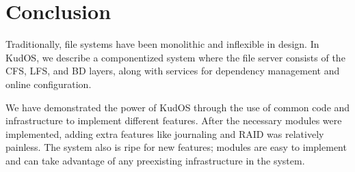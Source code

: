 \section{Conclusion}
\label{sec:conclusion}

Traditionally, file systems have been monolithic and inflexible in design. In
KudOS, we describe a componentized system where the file server consists of the
CFS, LFS, and BD layers, along with services for dependency management and
online configuration. 

We have demonstrated the power of KudOS through the use of common code and
infrastructure to implement different features. After the necessary modules were
implemented, adding extra features like journaling and RAID was relatively
painless. The system also is ripe for new features; modules are easy to
implement and can take advantage of any preexisting infrastructure in the
system.
